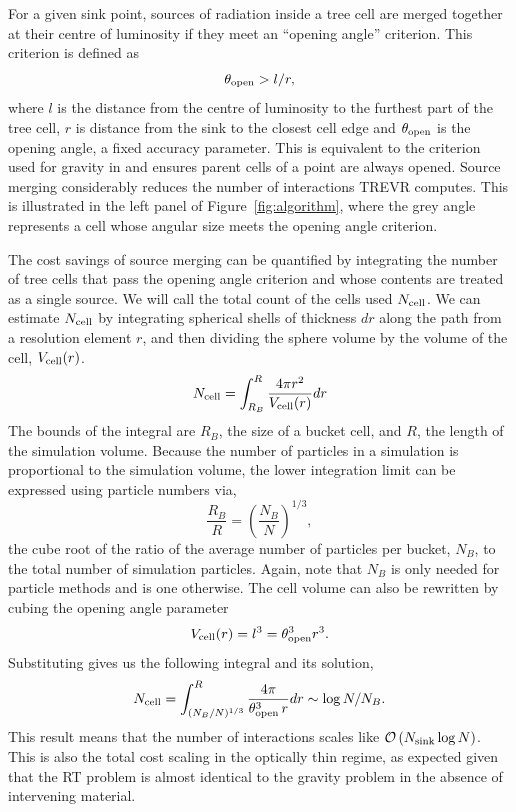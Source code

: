 \documentclass[fleq,usenatbib]{mnras}
\newcommand{\acro}{TREVR}
\newcommand{\bigO}[1]{\mathcal{O}\left(#1\right)}
\newcommand{\NK}{N_{\rm sink}}
\newcommand{\tO}{\theta_{\rm open}}
\begin{document}
{For a given sink point, sources of 
radiation inside a tree cell are merged together at their centre of luminosity if they meet an 
``opening angle'' criterion. This criterion is defined as 
\begin{equation}
\label{eqn:openangle}
\tO > l/r,
\end{equation}
where $l$ is the distance from the centre of luminosity to the furthest part of
the tree cell, $r$ is distance from the sink to the closest cell edge 
and $\tO$ is the opening angle, a fixed accuracy parameter.  This is equivalent to
the criterion used for gravity in \citet{wadsleyEt04} and ensures parent cells
of a point are always opened.  
Source merging considerably reduces the number of 
interactions \acro{} computes. This is illustrated in the left panel of 
Figure~\ref{fig:algorithm}, where the grey angle represents a cell whose 
angular size meets the opening angle criterion.

The cost savings of source merging can be quantified by integrating the number 
of tree cells that pass the opening angle criterion and whose contents are treated as a single source.
We will call the total count of the cells used $N_{\rm cell}$. We can
estimate $N_{\rm cell}$ by integrating spherical shells of 
thickness $dr$ along the path from a resolution element $r$, and then dividing 
the sphere volume by the volume of the cell, $V_{\rm cell}(r)$.
\begin{equation}
\label{eqn:nsint}
N_{\rm cell} = \int_{R_B}^R \frac{4\pi r^2}{V_{\rm cell}(r)} dr
\end{equation}
The bounds of the integral are $R_B$, the size of a bucket 
cell, and $R$, the length of the simulation volume. Because the number of 
particles in a simulation is proportional to the simulation volume, the 
lower integration limit can be expressed using particle numbers via,
\begin{equation}
\label{eqn:ratio}
\frac{R_B}{R} = \left(\frac{N_B}{N}\right)^{1/3},
\end{equation} 
the cube root of the ratio of the average number of particles per bucket, 
$N_B$, to the total number of simulation particles. Again, note that $N_B$ is 
only needed for particle methods and is one otherwise. The cell volume 
can also be rewritten by cubing the opening angle parameter
\begin{equation}
\label{eqn:vcell}
V_{\rm cell}(r) = l^3 = \tO^3 r^3.
\end{equation}
Substituting gives us the following integral and its solution,
\begin{equation}
\label{eqn:nssoln}
N_{\rm cell} = \int_{(N_B/N)^{1/3}}^R  \frac{4\pi}{\tO^3\,r} dr
\sim \log{N/N_B}.
\end{equation}
This result means that the number of interactions scales like 
$\bigO{\NK \log N}$. This is also the total cost scaling in the optically 
thin regime, as expected given that the RT problem is almost identical to 
the gravity problem in the absence of intervening material.

}
\end{document}
